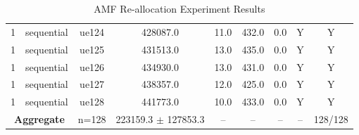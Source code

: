\begin{table}[ht]
\begin{tabular}{|c|c|c|c|c|c|c|c|c|}
1 & sequential & ue124 & 428087.0 & 11.0 & 432.0 & 0.0 & Y & Y \\
1 & sequential & ue125 & 431513.0 & 13.0 & 435.0 & 0.0 & Y & Y \\
1 & sequential & ue126 & 434930.0 & 13.0 & 431.0 & 0.0 & Y & Y \\
1 & sequential & ue127 & 438357.0 & 12.0 & 425.0 & 0.0 & Y & Y \\
1 & sequential & ue128 & 441773.0 & 10.0 & 433.0 & 0.0 & Y & Y \\
\multicolumn{2}{|c|}{\textbf{Aggregate}} & n=128 & 223159.3 $\pm$ 127853.3 & -- & -- & -- & -- & 128/128 \\
\hline
\end{tabular}
\caption{AMF Re-allocation Experiment Results}
\label{tab:amf_realloc}
\end{table}
